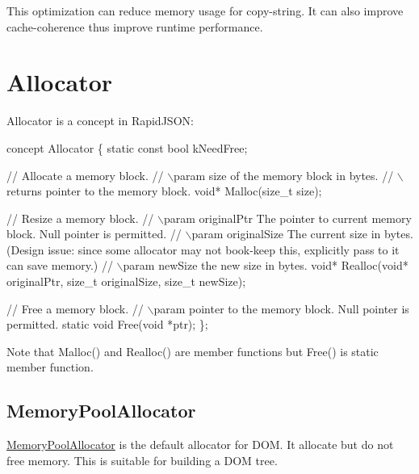 This optimization can reduce memory usage for copy-\/string. It can also improve cache-\/coherence thus improve runtime performance.\hypertarget{md_Commun_Externe_RapidJSON_doc_internals_Allocator}{}\section{Allocator}\label{md_Commun_Externe_RapidJSON_doc_internals_Allocator}
{\ttfamily Allocator} is a concept in Rapid\+J\+S\+ON\+: 
\begin{DoxyCode}
concept Allocator \{
    \textcolor{keyword}{static} \textcolor{keyword}{const} \textcolor{keywordtype}{bool} kNeedFree;    

    \textcolor{comment}{// Allocate a memory block.}
    \textcolor{comment}{// \(\backslash\)param size of the memory block in bytes.}
    \textcolor{comment}{// \(\backslash\)returns pointer to the memory block.}
    \textcolor{keywordtype}{void}* Malloc(\textcolor{keywordtype}{size\_t} size);

    \textcolor{comment}{// Resize a memory block.}
    \textcolor{comment}{// \(\backslash\)param originalPtr The pointer to current memory block. Null pointer is permitted.}
    \textcolor{comment}{// \(\backslash\)param originalSize The current size in bytes. (Design issue: since some allocator may not book-keep
       this, explicitly pass to it can save memory.)}
    \textcolor{comment}{// \(\backslash\)param newSize the new size in bytes.}
    \textcolor{keywordtype}{void}* Realloc(\textcolor{keywordtype}{void}* originalPtr, \textcolor{keywordtype}{size\_t} originalSize, \textcolor{keywordtype}{size\_t} newSize);

    \textcolor{comment}{// Free a memory block.}
    \textcolor{comment}{// \(\backslash\)param pointer to the memory block. Null pointer is permitted.}
    \textcolor{keyword}{static} \textcolor{keywordtype}{void} Free(\textcolor{keywordtype}{void} *ptr);
\};
\end{DoxyCode}


Note that {\ttfamily Malloc()} and {\ttfamily Realloc()} are member functions but {\ttfamily Free()} is static member function.\hypertarget{md_Commun_Externe_RapidJSON_doc_internals_MemoryPoolAllocator}{}\subsection{Memory\+Pool\+Allocator}\label{md_Commun_Externe_RapidJSON_doc_internals_MemoryPoolAllocator}
{\ttfamily \hyperlink{class_memory_pool_allocator}{Memory\+Pool\+Allocator}} is the default allocator for D\+OM. It allocate but do not free memory. This is suitable for building a D\+OM tree.


